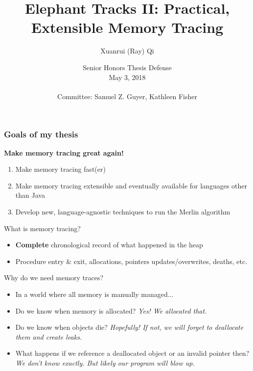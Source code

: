 \documentclass[11pt]{beamer}
\author{Xuanrui (Ray) Qi}
\title{Elephant Tracks II: Practical, Extensible Memory Tracing}
\institute{Department of Computer Science,\\Tufts University}
\date{Senior Honors Thesis Defense\\May 3, 2018\\~\\
  \small
  Committee: Samuel Z. Guyer, Kathleen Fisher}
\begin{document}
\begin{frame}
  \titlepage
\end{frame}


\begin{frame}
  \frametitle{Goals of my thesis}
  \textbf{Make memory tracing great again!}
  \begin{enumerate}
  \item Make memory tracing fast(er)
  \item Make memory tracing extensible and eventually available for
    languages other than Java
  \item Develop new, language-agnostic techniques to run the Merlin algorithm
  \end{enumerate}
\end{frame}

\begin{frame}{What is memory tracing?}
  \begin{itemize}
  \item \textbf{Complete} chronological record of what happened in the heap
  \item Procedure entry \& exit, allocations, pointers updates/overwrites, deaths, etc.
  \end{itemize}
\end{frame}

\begin{frame}{Why do we need memory traces?}
  \begin{itemize}
  \item In a world where all memory is manually managed...
    \pause
  \item Do we know when memory is allocated? \pause
    \textit{Yes! We allocated that.} \pause
  \item Do we know when objects die? \pause
    \textit{Hopefully! If not, we will forget to deallocate them and create leaks.}
    \pause
  \item What happens if we reference a deallocated object or an invalid pointer 
    then? \pause \textit{We don't know exactly. But likely our program will blow up.}
  \end{itemize}
\end{frame}
\end{document}
